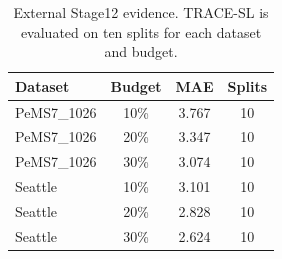 \begin{table}[pos=htbp]
\centering
\caption{External Stage12 evidence. TRACE-SL is evaluated on ten splits for each dataset and budget.}
\label{tab:external}
\small
\begin{tabular}{lccc}
\toprule
Dataset & Budget & MAE & Splits \\
\midrule
PeMS7\_1026 & 10\% & 3.767 & 10 \\
PeMS7\_1026 & 20\% & 3.347 & 10 \\
PeMS7\_1026 & 30\% & 3.074 & 10 \\
Seattle & 10\% & 3.101 & 10 \\
Seattle & 20\% & 2.828 & 10 \\
Seattle & 30\% & 2.624 & 10 \\
\bottomrule
\end{tabular}
\end{table}
